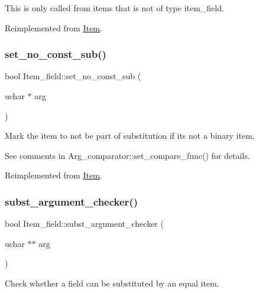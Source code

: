 This is only called from items that is not of type item\+\_\+field. 

Reimplemented from \mbox{\hyperlink{classItem_a7d1b934e9612e1c78bd369b31e3d9cb1}{Item}}.

\mbox{\label{classItem__field_a07f3871fa461313029a577362bb1d807}} 
\subsubsection{\texorpdfstring{set\+\_\+no\+\_\+const\+\_\+sub()}{set\_no\_const\_sub()}}
{\footnotesize\ttfamily bool Item\+\_\+field\+::set\+\_\+no\+\_\+const\+\_\+sub (\begin{DoxyParamCaption}\item[{uchar $\ast$}]{arg }\end{DoxyParamCaption})\hspace{0.3cm}{\ttfamily [virtual]}}

Mark the item to not be part of substitution if it\textquotesingle{}s not a binary item.

See comments in Arg\+\_\+comparator\+::set\+\_\+compare\+\_\+func() for details. 

Reimplemented from \mbox{\hyperlink{classItem}{Item}}.

\mbox{\label{classItem__field_a6d34c165aab5625fdac312326e3f1f56}} 
\subsubsection{\texorpdfstring{subst\+\_\+argument\+\_\+checker()}{subst\_argument\_checker()}}
{\footnotesize\ttfamily bool Item\+\_\+field\+::subst\+\_\+argument\+\_\+checker (\begin{DoxyParamCaption}\item[{uchar $\ast$$\ast$}]{arg }\end{DoxyParamCaption})\hspace{0.3cm}{\ttfamily [virtual]}}

Check whether a field can be substituted by an equal item.

